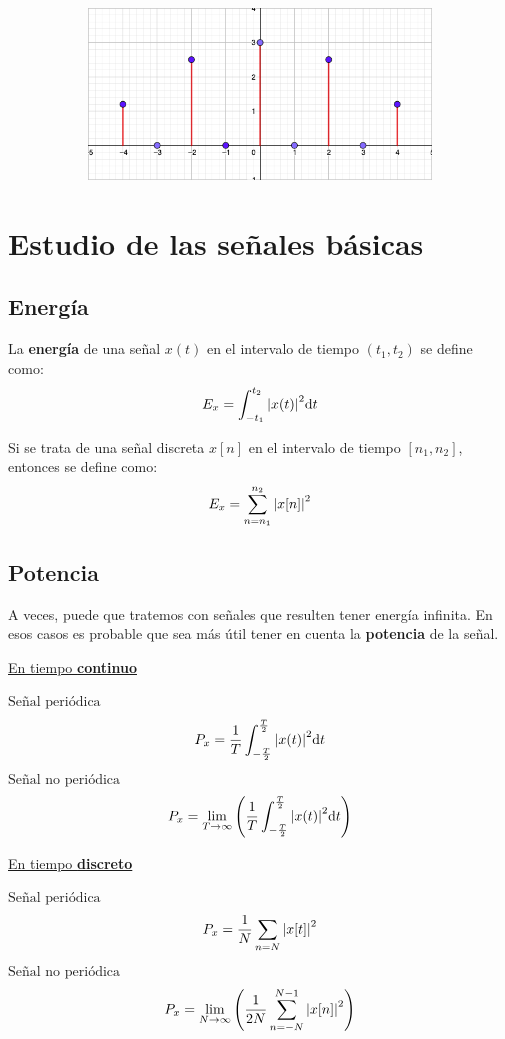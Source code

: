 \documentclass[a4paper]{book}
\begin{document}
\begin{figure}[!ht]
	\begin{subfigure}[b]{0.7\textwidth}
		\includegraphics[width=\textwidth]{./Imágenes/aam.png}
	\end{subfigure}
	\label{fig:cambio_de_escala_discreto}
\end{figure}


\newpage
\section{Estudio de las señales básicas}
\subsection{Energía}

La \textbf{energía} de una señal $x(t)$ en el intervalo de tiempo $\left( t_1, t_2 \right)$ se define como: \[E_x=\int_{-t_1}^{t_2}{\abs{x(t)}^2\dd t}\]

Si se trata de una señal discreta $x[n]$ en el intervalo de tiempo $\left[ n_1, n_2 \right]$, entonces se define como: \[E_x=\sum^{n_2}_{n=n_1}{\abs{x[n]}^2}\]

\subsection{Potencia}
A veces, puede que tratemos con señales que resulten tener energía infinita. En esos casos es probable que sea más útil tener en cuenta la \textbf{potencia} de la señal.
\vspace{10 pt}

{\centering

	\underline{En tiempo \textbf{continuo}}
	\begin{multicols}{2}
		$\boxed{\text{Señal periódica}}$
		\[P_x=\frac{1}{T}\int_{-\frac{T}{2}}^{\frac{T}{2}}{\abs{x(t)}^2\dd t}\]
		$\boxed{\text{Señal no periódica}}$
		\[P_x=\lim_{T \to \infty}{\left( \frac{1}{T}\int^{\frac{T}{2}}_{-\frac{T}{2}}{\abs{x(t)}^2\dd t} \right)}\]
	\end{multicols}

	\underline{En tiempo \textbf{discreto}}
	\begin{multicols}{2}
		$\boxed{\text{Señal periódica}}$
		\[P_x=\frac{1}{N}\sum_{n=N}{\abs{x[t]}^2}\]
		$\boxed{\text{Señal no periódica}}$
		\[P_x=\lim_{N \to \infty}{\left( \frac{1}{2N}\sum^{N-1}_{n=-N}{\abs{x[n]}^2} \right) }\]
	\end{multicols}}
\end{document}
